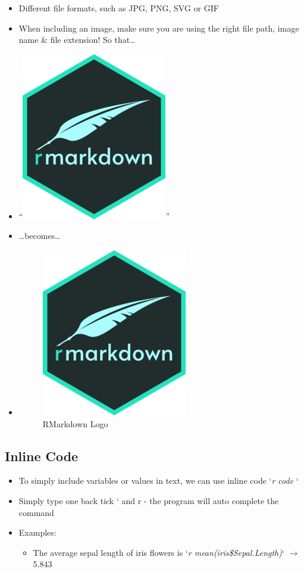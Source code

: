 \documentclass[
]{book}
\providecommand{\tightlist}{%
  \setlength{\itemsep}{0pt}\setlength{\parskip}{0pt}}
\begin{document}
\begin{itemize}
\item
  Different file formats, such as JPG, PNG, SVG or GIF
\item
  When including an image, make sure you are using the right file path, image name \& file extension! So that\ldots{}
\item
  ``\includegraphics{"./img/rmd.png"}''
\item
  \ldots becomes\ldots{}
\item
  \begin{figure}
  \centering
  \includegraphics{./img/rmd.png}
  \caption{RMarkdown Logo}
  \end{figure}
\end{itemize}

\subsection{Inline Code}\label{inline-code}

\begin{itemize}
\tightlist
\item
  To simply include variables or values in text, we can use inline code `\emph{r code} `
\item
  Simply type one back tick ` and r - the program will auto complete the command
\item
  Examples:

  \begin{itemize}
  \tightlist
  \item
    The average sepal length of iris flowers is
    `\emph{r mean(iris\$Sepal.Length)}` \(\rightarrow\) 5.843
  \end{itemize}
\end{itemize}
\end{document}
